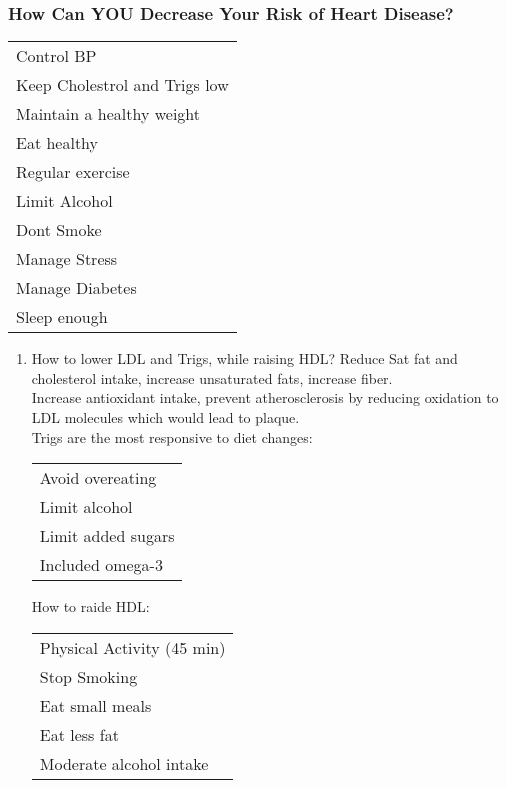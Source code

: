 \documentclass[letterpaper, 11pt]{article}
\begin{document}
\subsubsection{How Can YOU Decrease Your Risk of Heart Disease?}
\label{sec:orga39cbf9}
\begin{center}
\begin{tabular}{l}
Control BP\\
Keep Cholestrol and Trigs low\\
Maintain a healthy weight\\
Eat healthy\\
Regular exercise\\
Limit Alcohol\\
Dont Smoke\\
Manage Stress\\
Manage Diabetes\\
Sleep enough\\
\end{tabular}
\end{center}
\begin{enumerate}
\item How to lower LDL and Trigs, while raising HDL?
\label{sec:org42027b7}
Reduce Sat fat and cholesterol intake, increase unsaturated fats, increase fiber.\\
Increase antioxidant intake, prevent atherosclerosis by reducing oxidation to LDL molecules which would lead to plaque.\\
Trigs are the most responsive to diet changes:\\
\begin{center}
\begin{tabular}{l}
Avoid overeating\\
Limit alcohol\\
Limit added sugars\\
Included omega-3\\
\end{tabular}
\end{center}
How to raide HDL:\\
\begin{center}
\begin{tabular}{l}
Physical Activity (45 min)\\
Stop Smoking\\
Eat small meals\\
Eat less fat\\
Moderate alcohol intake\\
\end{tabular}
\end{center}
\end{enumerate}
\end{document}
